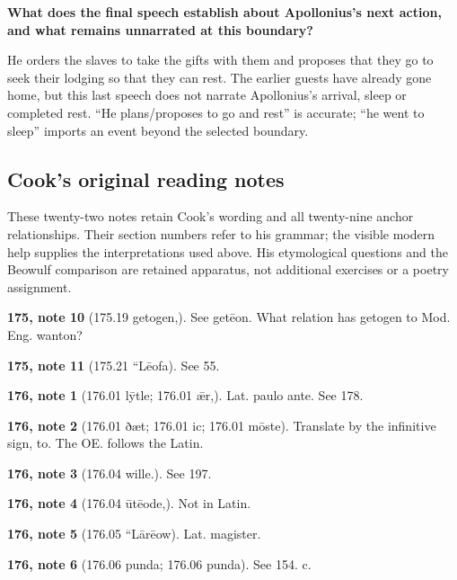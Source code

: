 \textbf{What does the final speech establish about Apollonius’s next action, and what remains unnarrated at this boundary?}

He orders the slaves to take the gifts with them and proposes that they go to seek their lodging so that they can rest. The earlier guests have already gone home, but this last speech does not narrate Apollonius’s arrival, sleep or completed rest. “He plans/\allowbreak{}proposes to go and rest” is accurate; “he went to sleep” imports an event beyond the selected boundary.

\subsection*{Cook’s original reading notes}

These twenty-two notes retain Cook’s wording and all twenty-nine anchor relationships. Their section numbers refer to his grammar; the visible modern help supplies the interpretations used above. His etymological questions and the Beowulf comparison are retained apparatus, not additional exercises or a poetry assignment.

\textbf{175, note 10} (175.19 getogen,). See getēon. What relation has getogen to Mod. Eng. wanton?

\textbf{175, note 11} (175.21 “Lēofa). See 55.

\textbf{176, note 1} (176.01 lȳtle; 176.01 ǣr,). Lat. paulo ante. See 178.

\textbf{176, note 2} (176.01 ðæt; 176.01 ic; 176.01 mōste). Translate by the infinitive sign, to. The OE. follows the Latin.

\textbf{176, note 3} (176.04 wille.). See 197.

\textbf{176, note 4} (176.04 ūtēode,). Not in Latin.

\textbf{176, note 5} (176.05 “Lārēow). Lat. magister.

\textbf{176, note 6} (176.06 punda; 176.06 punda). See 154. c.

